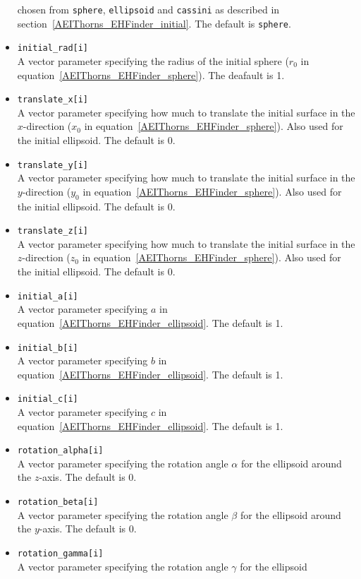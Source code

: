 \begin{itemize}
  chosen from {\tt sphere}, {\tt ellipsoid} and {\tt cassini} as described in
  section~\ref{AEIThorns_EHFinder_initial}. The default is {\tt sphere}.
\item {\tt initial\_rad[i]} \\
  A vector parameter specifying the radius of the initial sphere ($r_{0}$ in
  equation~\ref{AEIThorns_EHFinder_sphere}). The deafault is 1.
\item {\tt translate\_x[i]} \\
  A vector parameter specifying how much to translate the initial surface in
  the $x$-direction ($x_{0}$ in equation~\ref{AEIThorns_EHFinder_sphere}).
  Also used for the initial ellipsoid. The default is 0.
\item {\tt translate\_y[i]} \\
  A vector parameter specifying how much to translate the initial surface in
  the $y$-direction ($y_{0}$ in equation~\ref{AEIThorns_EHFinder_sphere}).
  Also used for the initial ellipsoid. The default is 0.
\item {\tt translate\_z[i]} \\
  A vector parameter specifying how much to translate the initial surface in
  the $z$-direction ($z_{0}$ in equation~\ref{AEIThorns_EHFinder_sphere}).
  Also used for the initial ellipsoid. The default is 0.
\item {\tt initial\_a[i]} \\
  A vector parameter specifying $a$ in
  equation~\ref{AEIThorns_EHFinder_ellipsoid}. The default is 1.
\item {\tt initial\_b[i]} \\
  A vector parameter specifying $b$ in
  equation~\ref{AEIThorns_EHFinder_ellipsoid}. The default is 1.
\item {\tt initial\_c[i]} \\
  A vector parameter specifying $c$ in
  equation~\ref{AEIThorns_EHFinder_ellipsoid}. The default is 1.
\item {\tt rotation\_alpha[i]} \\
  A vector parameter specifying the rotation angle $\alpha$ for the ellipsoid
  around the $z$-axis. The default is 0.
\item {\tt rotation\_beta[i]} \\
  A vector parameter specifying the rotation angle $\beta$ for the ellipsoid
  around the $y$-axis. The default is 0.
\item {\tt rotation\_gamma[i]} \\
  A vector parameter specifying the rotation angle $\gamma$ for the ellipsoid

\end{itemize}
